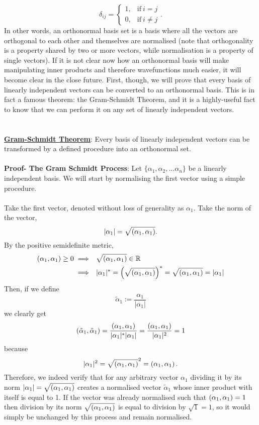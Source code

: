 $$
\delta_{ij}=
\begin{cases}
1, &\text{if}\ i=j\\
0, &\text{if}\ i \neq j
\end{cases}.
$$
In other words, an orthonormal basis set is a basis where all the vectors are orthogonal to each other and themselves are normalised (note that orthogonality is a property shared by two or more vectors, while normalisation is a property of single vectors). If it is not clear now how an orthonormal basis will make manipulating inner products and therefore wavefunctions much easier, it will become clear in the close future. First, though, we will prove that every basis of linearly independent vectors can be converted to an orthonormal basis. This is in fact a famous theorem: the Gram-Schmidt Theorem, and it is a highly-useful fact to know that we can perform it on any set of linearly independent vectors.
\\\\\\
\underline{\textbf{Gram-Schmidt Theorem}}: Every basis of linearly independent vectors can be transformed by a defined procedure into an orthonormal set.
\\\\
\textbf{Proof- The Gram Schmidt Process}: Let $\{\alpha_{1},\alpha_{2},... \alpha_{n}\}$ be a linearly independent basis. We will start by normalising the first vector using a simple procedure. 
\\\\
Take the first vector, denoted without loss of generality as $\alpha_{1}$. Take the norm of the vector,
$$
|\alpha_{1}|=\sqrt{\left(\alpha_{1},\alpha_{1}\right)}.
$$
By the positive semidefinite metric,
$$
\begin{aligned}
\left(\alpha_{1},\alpha_{1}\right) \geq 0 &\implies \:\: \sqrt{\left(\alpha_{1},\alpha_{1}\right)} \in \mathbb{R}\\
&\implies \:\: |\alpha_1|^{\ast}=\left(\sqrt{\left(\alpha_{1},\alpha_{1}\right)}\right)^{\ast}= \sqrt{\left(\alpha_{1},\alpha_{1}\right)} =|\alpha_1|
\end{aligned}
$$
Then, if we define
$$
\tilde{\alpha}_{1} := \frac{\alpha_{1}}{|\alpha_{1}|}
$$
we clearly get
$$
\left(\tilde{\alpha}_{1},\tilde{\alpha}_{1}\right) = \frac{\left({\alpha}_{1},{\alpha}_{1}\right)}{|\alpha_{1}|^{\ast}|\alpha_{1}|}=\frac{\left({\alpha}_{1},{\alpha}_{1}\right)}{|\alpha_{1}|^{2}}=1
$$
because
$$
|\alpha_{1}|^2= \sqrt{\left(\alpha_{1},\alpha_{1}\right)}^2 = \left(\alpha_{1},\alpha_{1}\right).
$$
Therefore, we indeed verify that for any arbitrary vector $\alpha_{1}$ dividing it by its norm $|\alpha_{1}|=\sqrt{\left(\alpha_{1},\alpha_{1}\right)}$ creates a normalised vector $\tilde{\alpha}_{1}$ whose inner product with itself is equal to 1. If the vector was already normalised such that $\left(\alpha_{1},\alpha_{1}\right)=1$ then division by its norm $\sqrt{\left(\alpha_{1},\alpha_{1}\right)}$ is equal to division by $\sqrt{1}=1$, so it would simply be unchanged by this process and remain normalised.
